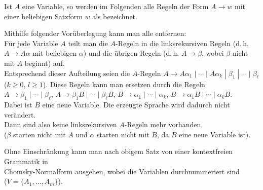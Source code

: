 \begin{Beweis}
    Ist $A$ eine Variable, so werden im Folgenden alle Regeln der Form
    $A \rightarrow w$ mit einer beliebigen Satzform $w$ als
     bezeichnet.

    Mithilfe folgender Vorüberlegung kann man alle
     entfernen:\\
    Für jede Variable $A$ teilt man die $A$-Regeln in die linksrekursiven
    Regeln (d.\,h. $A \rightarrow A\alpha$ mit beliebigen $\alpha$) und
    die übrigen Regeln (d.\,h. $A \rightarrow \beta$, wobei $\beta$ nicht mit
    $A$ beginnt) auf.\\
    Entsprechend dieser Aufteilung seien die $A$-Regeln
    $A \rightarrow A\alpha_1 \;|\; \dotsb \;|\; A\alpha_k \;|\;
    \beta_1 \;|\; \dotsb \;|\; \beta_\ell$\\
    ($k \ge 0$, $l \ge 1$).
    Diese Regeln kann man ersetzen durch die Regeln\\
    $A \rightarrow \beta_1 \;|\; \dotsb \;|\; \beta_\ell$,\qquad
    $A \rightarrow \beta_1 B \;|\; \dotsb \;|\; \beta_\ell B$,\qquad
    $B \rightarrow \alpha_1 \;|\; \dotsb \;|\; \alpha_k$,\qquad
    $B \rightarrow \alpha_1 B \;|\; \dotsb \;|\; \alpha_k B$.\\
    Dabei ist $B$ eine neue Variable.
    Die erzeugte Sprache wird dadurch nicht verändert.\\
    Dann sind also keine linksrekursiven $A$-Regeln mehr vorhanden\\
    ($\beta$ starten nicht mit $A$ und $\alpha$ starten nicht mit $B$, da $B$
    eine neue Variable ist).

    \pagebreak

    Ohne Einschränkung kann man nach obigem Satz von einer kontextfreien
    Grammatik in\\
    Chomsky-Normalform ausgehen, wobei die Variablen durchnummeriert sind\\
    ($V = \{A_1, \dotsc, A_m\}$).


\end{Beweis}
